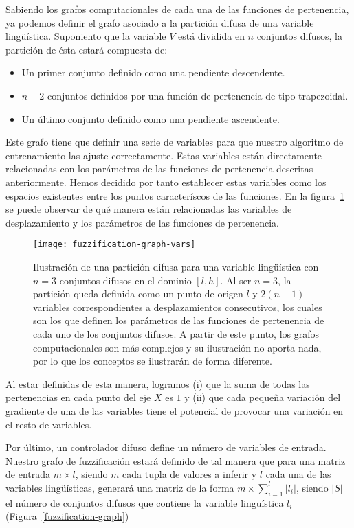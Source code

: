 Sabiendo los grafos computacionales de cada una de las funciones de pertenencia, ya podemos definir el grafo asociado a la partición difusa de una variable lingüística. Suponiento que la variable $V$ está dividida en $n$ conjuntos difusos, la partición de ésta estará compuesta de:

\begin{itemize}
	\item Un primer conjunto definido como una pendiente descendente.
	\item $n - 2$ conjuntos definidos por una función de pertenencia de tipo trapezoidal.
	\item Un último conjunto definido como una pendiente ascendente.
\end{itemize}

Este grafo tiene que definir una serie de variables para que nuestro algoritmo de entrenamiento las ajuste correctamente. Estas variables están directamente relacionadas con los parámetros de las funciones de pertenencia descritas anteriormente. Hemos decidido por tanto establecer estas variables como los espacios existentes entre los puntos caracteríscos de las funciones. En la figura~\ref{fig:fuzzification-graph-vars} se puede observar de qué manera están relacionadas las variables de desplazamiento y los parámetros de las funciones de pertenencia.

\begin{figure}
	\centering
	\texttt{[image: fuzzification-graph-vars]}
	\caption[Representación de una partición difusa para su ajuste]{Ilustración de una partición difusa para una variable lingüística con $n = 3$ conjuntos difusos en el dominio $[l, h]$. Al ser $n = 3$, la partición queda definida como un punto de origen $l$ y $2(n - 1)$ variables correspondientes a desplazamientos consecutivos, los cuales son los que definen los parámetros de las funciones de pertenencia de cada uno de los conjuntos difusos. A partir de este punto, los grafos computacionales son más complejos y su ilustración no aporta nada, por lo que los conceptos se ilustrarán de forma diferente.}
	\label{fig:fuzzification-graph-vars}
\end{figure}

Al estar definidas de esta manera, logramos (i) que la suma de todas las pertenencias en cada punto del eje $X$ es $1$ y (ii) que cada pequeña variación del gradiente de una de las variables tiene el potencial de provocar una variación en el resto de variables.

Por último, un controlador difuso define un número de variables de entrada. Nuestro grafo de fuzzificación estará definido de tal manera que para una matriz de entrada $m \times l$, siendo $m$ cada tupla de valores a inferir y $l$ cada una de las variables lingüísticas, generará una matriz de la forma $m \times \sum_{i=1}^l \left\vert{l_i}\right\vert$, siendo $\left\vert{S}\right\vert$ el número de conjuntos difusos que contiene la variable linguística $l_i$ (Figura~\ref{fuzzification-graph})

